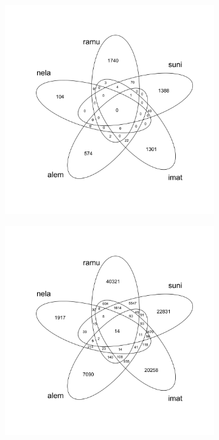 \documentclass[10pt,letterpaper]{article}
\begin{document}
\begin{figure}[!h]
\begin{adjustwidth}{-0.5in}{0in} %
\centering
\scalebox{0.99}
{
\begin{subfigure}{.5\textwidth}
  \centering
  \includegraphics[width=.95\linewidth]{citing_pmid.png}
  \label{fig:sub1}
\end{subfigure}
\begin{subfigure}{.5\textwidth}
  \centering
  \includegraphics[width=.95\linewidth]{cited_sid.png}

\end{subfigure}}
\end{adjustwidth}
\end{figure}
\end{document}

